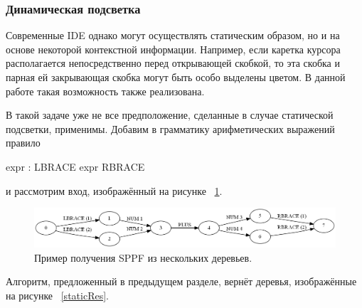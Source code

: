 \subsubsection{Динамическая подсветка}
Современные IDE однако могут осуществлять статическим образом, но и на основе некоторой контекстной информации. Например, если каретка курсора располагается непосредственно перед открывающей скобкой, то эта скобка и парная ей закрывающая скобка могут быть особо выделены цветом. В данной работе такая возможность также реализована. 

В такой задаче уже не все предположение, сделанные в случае статической подсветки, применимы. Добавим в грамматику арифметических выражений правило 

expr : LBRACE expr RBRACE

и рассмотрим вход, изображённый на рисунке ~\ref{dynamic_idea}. 

\begin{figure}[h]
\centering
\includegraphics[width=150mm]{Pictures/Dynamic_Idea.png}
\caption{Пример получения SPPF из нескольких деревьев.}
\label{dynamic_idea}
\end{figure}

Алгоритм, предложенный в предыдущем разделе, вернёт деревья, изображённые на рисунке ~\ref{staticRes}.

